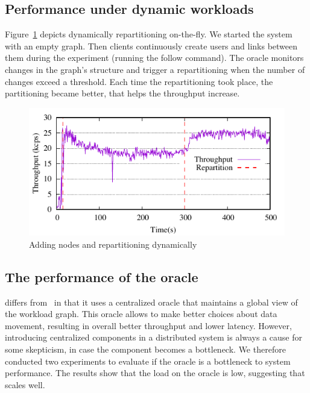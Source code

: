 \subsection{Performance under dynamic workloads}

Figure~\ref{fig:dynamic_load_tput} depicts dynamically repartitioning
on-the-fly.  We started the system with an empty graph. Then clients
continuously create users and links between them during the experiment
(running the follow command).  The oracle monitors changes in the
graph's structure and trigger a repartitioning when the number of
changes exceed a threshold.  Each time the repartitioning took place,
the partitioning became better, that helps the throughput increase.

\begin{figure}[ht]
	\includegraphics{figures/experiments/dynamicload-tp-move-4p}
	\caption{Adding nodes and repartitioning dynamically}
	\label{fig:dynamic_load_tput}
\end{figure}

\subsection{The performance of the oracle}

\dynastar differs from \dssmr\ in that it uses a centralized oracle
that maintains a global view of the workload graph. This oracle allows
\dynastar to make better choices about data movement, resulting in overall
better throughput and lower latency. However, introducing centralized
components in a distributed system is always a cause for some skepticism,
in case the component becomes a bottleneck. We therefore conducted two
experiments to evaluate if the \dynastar oracle is a bottleneck to
system performance. The results show that the load on the oracle is
low, suggesting that \dynastar scales well.


